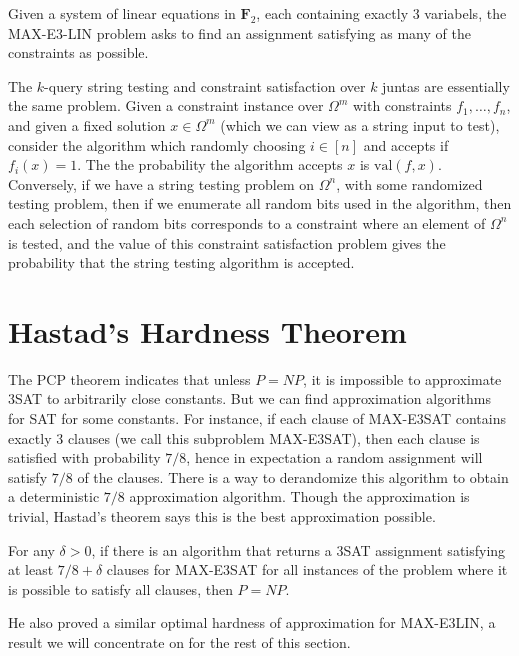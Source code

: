 \begin{example}
    Given a system of linear equations in $\mathbf{F}_2$, each containing exactly 3 variabels, the MAX-E3-LIN problem asks to find an assignment satisfying as many of the constraints as possible.
\end{example}

The $k$-query string testing and constraint satisfaction over $k$ juntas are essentially the same problem. Given a constraint instance over $\Omega^m$ with constraints $f_1, \dots, f_n$, and given a fixed solution $x \in \Omega^m$ (which we can view as a string input to test), consider the algorithm which randomly choosing $i \in [n]$ and accepts if $f_i(x) = 1$. The the probability the algorithm accepts $x$ is $\text{val}(f, x)$. Conversely, if we have a string testing problem on $\Omega^n$, with some randomized testing problem, then if we enumerate all random bits used in the algorithm, then each selection of random bits corresponds to a constraint where an element of $\Omega^n$ is tested, and the value of this constraint satisfaction problem gives the probability that the string testing algorithm is accepted.

\section{Hastad's Hardness Theorem}

The PCP theorem indicates that unless $P = NP$, it is impossible to approximate 3SAT to arbitrarily close constants. But we can find approximation algorithms for SAT for some constants. For instance, if each clause of MAX-E3SAT contains exactly 3 clauses (we call this subproblem MAX-E3SAT), then each clause is satisfied with probability $7/8$, hence in expectation a random assignment will satisfy $7/8$ of the clauses. There is a way to derandomize this algorithm to obtain a deterministic $7/8$ approximation algorithm. Though the approximation is trivial, Hastad's theorem says this is the best approximation possible.

\begin{theorem}[Hastad]
    For any $\delta > 0$, if there is an algorithm that returns a 3SAT assignment satisfying at least $7/8 + \delta$ clauses for MAX-E3SAT for all instances of the problem where it is possible to satisfy all clauses, then $P = NP$.
\end{theorem}

He also proved a similar optimal hardness of approximation for MAX-E3LIN, a result we will concentrate on for the rest of this section.

